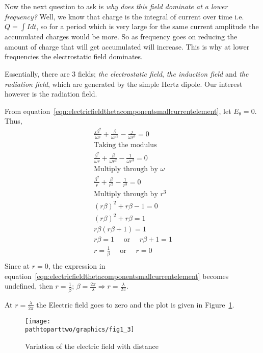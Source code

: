 Now the next question to ask is \emph{why does this field dominate at a lower frequency?} Well, we know that charge is the integral of current over time i.e. $Q =\int Idt$, so for a period which is very large for the same current amplitude the accumulated charges would be more. So as frequency goes on reducing the amount of charge that will get accumulated will increase. This is why at lower frequencies the electrostatic field dominates.

Essentially, there are 3 fields; \emph{the electrostatic field}, \emph{the induction field} and \emph{the radiation field}, which are generated by the simple Hertz dipole. Our interest however is the radiation field. 

From equation~\eqref{eqn:electricfieldthetacomponentsmallcurrentelement}, let $E_{\theta} = 0$. Thus,
\begin{align*}
&\frac{j\beta^2}{\omega r} + \frac{\beta}{\omega r^2} - \frac{j}{\omega r^3} = 0&\\
&\text{Taking the modulus}&\\
&\frac{\beta^2}{\omega r} + \frac{\beta}{\omega r^2} - \frac{1}{\omega r^3} = 0&\\
&\text{Multiply through by $\omega$}&\\
&\frac{\beta^2}{r} + \frac{\beta}{r^2} - \frac{1}{r^3} = 0&\\
&\text{Multiply through by $r^3$}&\\
&(r\beta)^2 + r\beta - 1 = 0&\\
&(r\beta)^2 + r\beta = 1&\\
&r\beta(r\beta + 1) = 1&\\
&r\beta = 1\quad\text{ or }\quad r\beta + 1 = 1&\\
&r = \frac{1}{\beta}\quad\text{ or }\quad r = 0&\\
\end{align*}
Since at $ r = 0$, the expression in equation~\eqref{eqn:electricfieldthetacomponentsmallcurrentelement} becomes undefined, then $ r = \frac{1}{\beta} $; $\beta = \frac{2\pi}{\lambda} \Longrightarrow r =  \frac{\lambda}{2 \pi} $.

At $ r =  \frac{\lambda}{2 \pi} $ the Electric field goes to zero and the plot is given in Figure~\ref{fig:electricfiedvariationwithdistance}.
\begin{figure}[h]
\centering
\texttt{[image: \\pathtoparttwo/graphics/fig1\_3]}
\caption{Variation of the electric field with distance}
\label{fig:electricfiedvariationwithdistance}
\end{figure}

